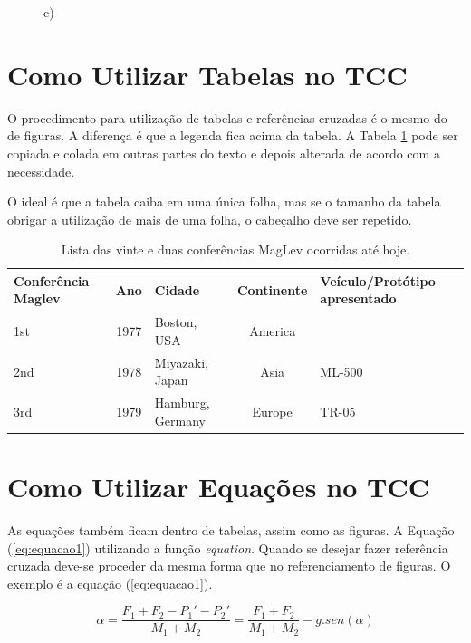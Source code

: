 \documentclass[
        oneside,      %
        english,			
        brazil			 
        ]{configcefetmglpd}
\begin{document}
\begin{figure}[h]
\begin{minipage}[t]{3cm}
	\par \centering c)
	\label{fig:SML}
\end{minipage}%
	\label{fig:1figs}%
\end{figure}

\section{Como Utilizar Tabelas no TCC}
O procedimento para utilização de tabelas e referências cruzadas é o mesmo do de figuras. A diferença é que a legenda fica acima da tabela. A Tabela \ref{tab:lista_Mag} pode ser copiada e colada em outras partes do texto e depois alterada de acordo com a necessidade.

O ideal é que a tabela caiba em uma única folha, mas se o tamanho da tabela obrigar a utilização de mais de uma folha, o cabeçalho deve ser repetido.

\begin{table}[!h]
	\normalsize
	\caption{Lista das vinte e duas conferências MagLev ocorridas até hoje.}
	\label{tab:lista_Mag}
	\begin{center}
		\begin{tabular}{ l | c | l | c | l}
			\hline
			Conferência Maglev & Ano & Cidade & Continente & Veículo/Protótipo apresentado\\ \hline
			1st & 1977 & Boston, USA & America &  \\
			2nd & 1978 & Miyazaki, Japan & Asia & ML-500 \\
			3rd & 1979 & Hamburg, Germany & Europe & TR-05 \\
		\end{tabular}
	\end{center}
\end{table}

\section{Como Utilizar Equações no TCC}

As equações também ficam dentro de tabelas, assim como as figuras. A Equação (\ref{eq:equacao1}) utilizando a função \textit{equation}.  Quando se desejar fazer referência cruzada deve-se proceder da mesma forma que no referenciamento de figuras. O exemplo é a equação (\ref{eq:equacao1}).

\begin{equation}
	\label{eq:equacao1}
	\alpha = \frac{F_1 + F_2 - P_1' - P_2'}{M_1+M_2} = \frac{F_1 + F_2}{M_1 + M_2}-g.sen(\alpha)
\end{equation}
\end{document}
